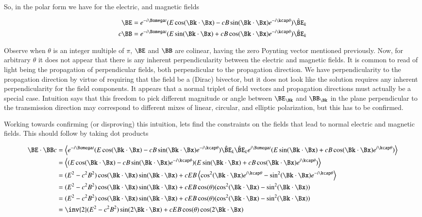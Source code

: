 So, in the polar form we have for the electric, and magnetic fields

\begin{align}\label{eqn:maxwellVacuum:fieldsPolar}
\BE &= e^{-i\Bomega t} (E \cos(\Bk \cdot \Bx) - c B \sin(\Bk \cdot \Bx) e^{-i \kcap\theta}) \hat{\BE}_k \\
c \BB &= e^{-i\Bomega t} (E \sin(\Bk \cdot \Bx) + c B \cos(\Bk \cdot \Bx) e^{-i \kcap\theta}) \hat{\BE}_k
\end{align}

Observe when $\theta$ is an integer multiple of $\pi$, $\BE$ and $\BB$ are colinear, having the zero Poynting vector mentioned previously.
Now, for arbitrary $\theta$ it does not appear that there is any inherent perpendicularity between the electric and magnetic fields.  It is common
to read of light being the propagation of perpendicular fields, both perpendicular to the propagation direction.  We have perpendicularity to the
propagation direction by virtue of requiring that the field be a (Dirac) bivector, but it does not look like the solution requires any inherent perpendicularity for the field components.  It appears that a normal triplet of field vectors and propagation directions must actually be a special case.
Intuition says that this freedom to pick different magnitude or angle between $\BE_\Bk$ and $\BB_\Bk$ in the plane perpendicular to the transmission direction may correspond to different mixes of linear, circular, and elliptic polarization, but this has to be confirmed.

Working towards confirming (or disproving) this intuition, lets find the constraints on the fields that lead to normal electric and magnetic fields.  This should follow by taking dot products

\begin{align*}
\BE \cdot \BB c
&=
\left\langle{
e^{-i\Bomega t} (E \cos(\Bk \cdot \Bx) - c B \sin(\Bk \cdot \Bx) e^{-i \kcap\theta}) \hat{\BE}_k
\hat{\BE}_k
e^{i\Bomega t} (E \sin(\Bk \cdot \Bx) + c B \cos(\Bk \cdot \Bx) e^{i \kcap\theta})
}\right\rangle \\
&=
\left\langle{
(E \cos(\Bk \cdot \Bx) - c B \sin(\Bk \cdot \Bx) e^{-i \kcap\theta})
(E \sin(\Bk \cdot \Bx) + c B \cos(\Bk \cdot \Bx) e^{i \kcap\theta})
}\right\rangle \\
&=
(E^2 - c^2 B^2) \cos(\Bk \cdot \Bx) \sin(\Bk \cdot \Bx)
+ c E B
\left\langle{
\cos^2(\Bk \cdot \Bx) e^{i \kcap \theta}
-\sin^2(\Bk \cdot \Bx) e^{-i \kcap \theta}
}\right\rangle \\
&=
(E^2 - c^2 B^2) \cos(\Bk \cdot \Bx) \sin(\Bk \cdot \Bx)
+ c E B \cos(\theta) ( \cos^2(\Bk \cdot \Bx) -\sin^2(\Bk \cdot \Bx) ) \\
&=
(E^2 - c^2 B^2) \cos(\Bk \cdot \Bx) \sin(\Bk \cdot \Bx)
+ c E B \cos(\theta) ( \cos^2(\Bk \cdot \Bx) -\sin^2(\Bk \cdot \Bx) ) \\
&=
\inv{2} (E^2 - c^2 B^2) \sin(2 \Bk \cdot \Bx)
+ c E B \cos(\theta) \cos(2 \Bk \cdot \Bx) \\
\end{align*}

